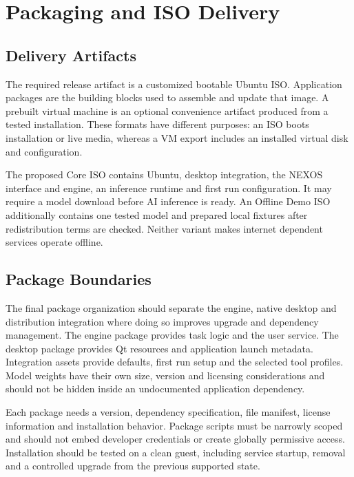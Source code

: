 \chapter{Packaging and ISO Delivery}
\section{Delivery Artifacts}
The required release artifact is a customized bootable Ubuntu ISO. Application packages are the building blocks used to assemble and update that image. A prebuilt virtual machine is an optional convenience artifact produced from a tested installation. These formats have different purposes: an ISO boots installation or live media, whereas a VM export includes an installed virtual disk and configuration.

The proposed Core ISO contains Ubuntu, desktop integration, the NEXOS interface and engine, an inference runtime and first run configuration. It may require a model download before AI inference is ready. An Offline Demo ISO additionally contains one tested model and prepared local fixtures after redistribution terms are checked. Neither variant makes internet dependent services operate offline.


\section{Package Boundaries}
The final package organization should separate the engine, native desktop and distribution integration where doing so improves upgrade and dependency management. The engine package provides task logic and the user service. The desktop package provides Qt resources and application launch metadata. Integration assets provide defaults, first run setup and the selected tool profiles. Model weights have their own size, version and licensing considerations and should not be hidden inside an undocumented application dependency.

Each package needs a version, dependency specification, file manifest, license information and installation behavior. Package scripts must be narrowly scoped and should not embed developer credentials or create globally permissive access. Installation should be tested on a clean guest, including service startup, removal and a controlled upgrade from the previous supported state.

